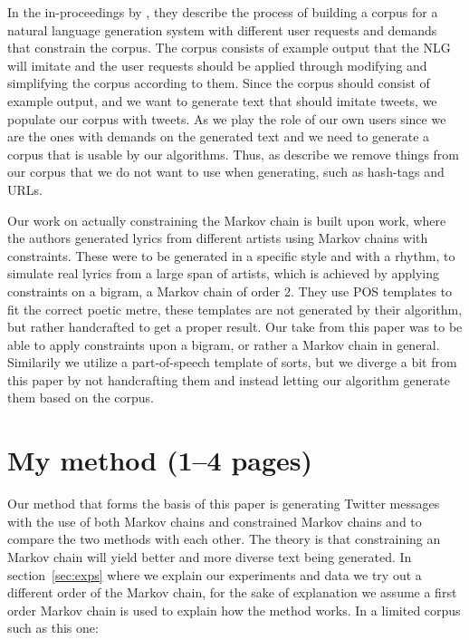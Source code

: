 \documentclass[a4paper,12pt]{article}
\begin{document}
In the in-proceedings by \cite{Corpus}, they describe the process of building a corpus for a natural language generation system with different user requests and demands that constrain the corpus. 
The corpus consists of example output that the NLG will imitate and the user requests should be applied through modifying and simplifying the corpus according to them.
Since the corpus should consist of example output, and we want to generate text that should imitate tweets, we populate our corpus with tweets.
As we play the role of our own users since we are the ones with demands on the generated text and we need to generate a corpus that is usable by our algorithms. Thus, as \citep{Corpus} describe we remove things from our corpus that we do not want to use when generating, such as hash-tags and URLs.


Our work on actually constraining the Markov chain is built upon \cite{McBarb} work, 
where the authors generated lyrics from different artists using Markov chains with constraints. 
These were to be generated in a specific style and with a rhythm, to simulate real lyrics from a large span of artists, which is achieved by applying constraints on a bigram, a Markov chain of order 2.
They use POS templates to fit the correct poetic metre, these templates are not generated by their algorithm, but rather handcrafted to get a proper result.
Our take from this paper was to be able to apply constraints upon a bigram, or rather a Markov chain in general. Similarily we utilize a part-of-speech template of sorts, but we diverge a bit from this paper by not handcrafting them and instead letting our algorithm generate them based on the corpus.


\newpage

\section{My method (1--4 pages)}
\label{sec:method}
Our method that forms the basis of this paper is generating Twitter messages with the use of both Markov chains and constrained Markov chains and to compare the two methods with each other.
The theory is that constraining an Markov chain will yield better and more diverse text being generated. 
In section~\ref{sec:exps} where we explain our experiments and data we try out a different order of the Markov chain, 
for the sake of explanation we assume a first order Markov chain is used to explain how the method works. 
In a limited corpus such as this one: \\
\end{document}
